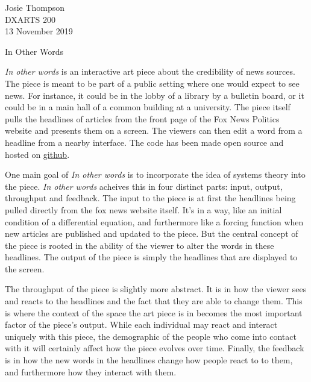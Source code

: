 \documentclass[12pt]{article}
\begin{document}
\begin{flushleft}

Josie Thompson\\
DXARTS 200\\
13 November 2019\\

\begin{center}
    In Other Words
\end{center}


\setlength{\parindent}{0.5in}

    \textit{In other words} is an interactive art piece about the credibility
    of news sources. The piece is meant to be part of a public setting where
    one would expect to see news. For instance, it could be in the lobby of a
    library by a bulletin board, or it could be in a main hall of a common
    building at a university. The piece itself pulls the headlines of articles
    from the front page of the Fox News Politics website and presents them on a
    screen. The viewers can then edit a word from a headline from a nearby
    interface. The code has been made open source and hosted on
    \href{https://github.com/josiest/In-Other-Words}{github}\footnotemark.

    One main goal of \textit{In other words} is to incorporate the idea of
    systems theory into the piece. \textit{In other words} acheives this in
    four distinct parts: input, output, throughput and feedback. The input to
    the piece is at first the headlines being pulled directly from the fox news
    website itself. It's in a way, like an initial condition of a differential
    equation, and furthermore like a forcing function when new articles are
    published and updated to the piece. But the central concept of the piece is
    rooted in the ability of the viewer to alter the words in these headlines.
    The output of the piece is simply the headlines that are displayed to the
    screen.

    The throughput of the piece is slightly more abstract. It is in how the
    viewer sees and reacts to the headlines and the fact that they are able to
    change them. This is where the context of the space the art piece is in
    becomes the most important factor of the piece's output. While each
    individual may react and interact uniquely with this piece, the demographic
    of the people who come into contact with it will certainly affect how the
    piece evolves over time. Finally, the feedback is in how the new words in
    the headlines change how people react to to them, and furthermore how they
    interact with them.


\end{flushleft}
\end{document}
